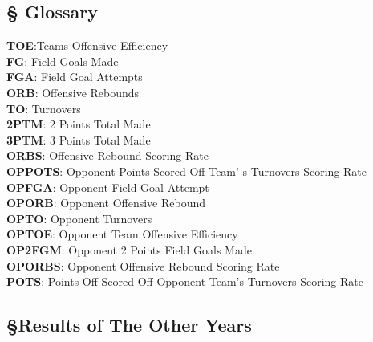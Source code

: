 \documentclass[11pt]{article}
\begin{document}
\subsection*{\S \hspace{0.8em} \textbf{Glossary}}
\textbf{TOE}:Teams Offensive Efficiency\\
\textbf{FG}: Field Goals Made\\
\textbf{FGA}: Field Goal Attempts\\
\textbf{ORB}: Offensive Rebounds\\
\textbf{TO}: Turnovers\\
\textbf{2PTM}: 2 Points Total Made\\
\textbf{3PTM}: 3 Points Total Made\\
\textbf{ORBS}: Offensive Rebound Scoring Rate\\
\textbf{OPPOTS}: Opponent Points Scored Off Team' s Turnovers Scoring Rate\\
\textbf{OPFGA}: Opponent Field Goal Attempt\\
\textbf{OPORB}: Opponent Offensive Rebound\\
\textbf{OPTO}: Opponent Turnovers\\
\textbf{OPTOE}: Opponent Team Offensive Efficiency\\
\textbf{OP2FGM}: Opponent 2 Points Field Goals Made\\
\textbf{OPORBS}: Opponent Offensive Rebound Scoring Rate\\
\textbf{POTS}: Points Off Scored Off Opponent Team's Turnovers Scoring Rate\\

\newpage

\newpage
\subsection*{\S Results of The Other Years}
\end{document}
